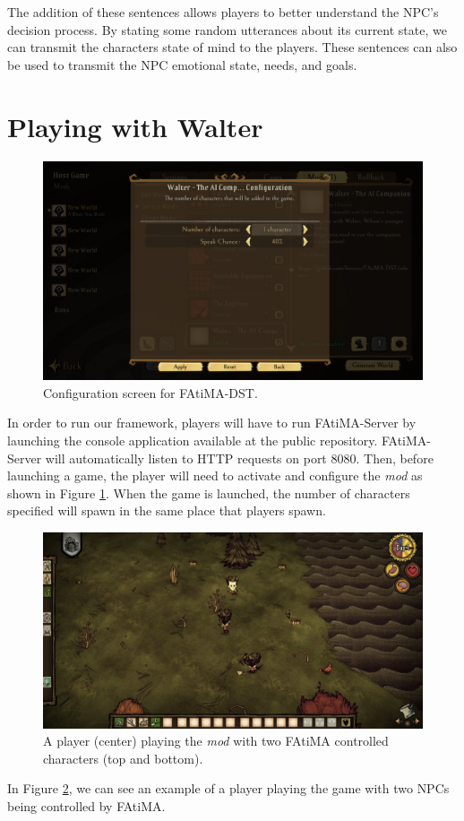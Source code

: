 The addition of these sentences allows players to better understand the \ac{NPC}'s decision process.
By stating some random utterances about its current state, we can transmit the characters state of mind to the players.
These sentences can also be used to transmit the \ac{NPC} emotional state, needs, and goals.

\section{Playing with Walter}

\begin{figure}
  \centering
  \includegraphics[width=\textwidth]{./Images/mod-config}
  \caption{Configuration screen for FAtiMA-DST.}
  \label{fig:mod-config}
\end{figure}

In order to run our framework, players will have to run FAtiMA-Server by launching the console application available at the public repository.
FAtiMA-Server will automatically listen to \ac{HTTP} requests on port 8080.
Then, before launching a game, the player will need to activate and configure the \textit{mod} as shown in Figure \ref{fig:mod-config}.
When the game is launched, the number of characters specified will spawn in the same place that players spawn.

\begin{figure}
  \centering
  \includegraphics[width=\textwidth]{./Images/multiple-agents}
  \caption{A player (center) playing the \textit{mod} with two FAtiMA controlled characters (top and bottom).}
  \label{fig:multiple-agents}
\end{figure}

In Figure \ref{fig:multiple-agents}, we can see an example of a player playing the game with two \acp{NPC} being controlled by \ac{FAtiMA}.
